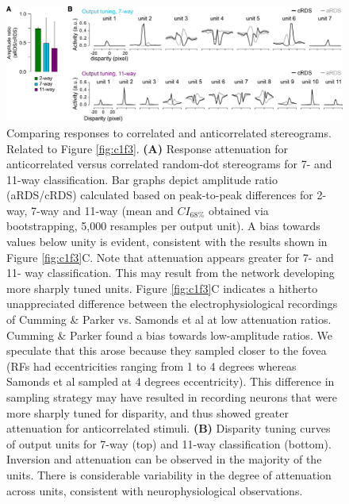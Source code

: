\begin{figure}[!h]
  \centering
  \includegraphics[width=14cm,keepaspectratio]{FigS3.png}
  \caption[Responses to correlated and anticorrelated stereograms.]{Comparing responses to correlated and anticorrelated stereograms. Related to Figure \ref{fig:c1f3}. \textbf{(A)} Response attenuation for anticorrelated versus correlated random-dot stereograms for 7- and 11-way classification. Bar graphs depict amplitude ratio (aRDS/cRDS) calculated based on peak-to-peak differences for 2-way, 7-way and 11-way (mean and $CI_{68\%}$ obtained via bootstrapping, 5,000 resamples per output unit). A bias towards values below unity is evident, consistent with the results shown in Figure \ref{fig:c1f3}C. Note that attenuation appears greater for 7- and 11- way classification. This may result from the network developing more sharply tuned units. Figure \ref{fig:c1f3}C indicates a hitherto unappreciated difference between the electrophysiological recordings of Cumming \& Parker \cite{Cumming:1997ve} vs. Samonds et al \cite{Samonds:2013cs} at low attenuation ratios. Cumming \& Parker \cite{Cumming:1997ve} found a bias towards low-amplitude ratios. We speculate that this arose because they sampled closer to the fovea (RFs had eccentricities ranging from 1 to 4 degrees whereas Samonds et al sampled at 4 degrees eccentricity). This difference in sampling strategy may have resulted in recording neurons that were more sharply tuned for disparity, and thus showed greater attenuation for anticorrelated stimuli. \textbf{(B)} Disparity tuning curves of output units for 7-way (top) and 11-way classification (bottom). Inversion and attenuation can be observed in the majority of the units. There is considerable variability in the degree of attenuation across units, consistent with neurophysiological observations.}
  \label{fig:c1fs3}
\end{figure}

